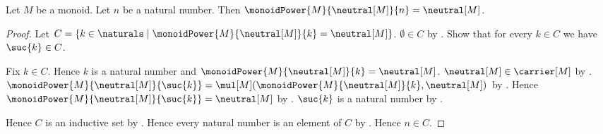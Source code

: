 \begin{proposition}\label{monoid_power_neutral}
    Let $M$ be a monoid.
    Let $n$ be a natural number.
    Then $\monoidPower{M}{\neutral[M]}{n}=\neutral[M]$.
\end{proposition}
\begin{proof}
    Let $C=\{k\in\naturals\mid
        \monoidPower{M}{\neutral[M]}{k}=\neutral[M]\}$.
    $\emptyset\in C$ by
        .
    Show that for every $k\in C$ we have $\suc{k}\in C$.
    \begin{subproof}
        Fix $k\in C$.
        Hence $k$ is a natural number and
            $\monoidPower{M}{\neutral[M]}{k}=\neutral[M]$.
        $\neutral[M]\in\carrier[M]$ by
            .
        $\monoidPower{M}{\neutral[M]}{\suc{k}}
            =\mul[M](\monoidPower{M}{\neutral[M]}{k},\neutral[M])$ by
            .
        Hence $\monoidPower{M}{\neutral[M]}{\suc{k}}
            =\neutral[M]$ by
            .
        $\suc{k}$ is a natural number by .
    \end{subproof}
    Hence $C$ is an inductive set by .
    Hence every natural number is an element of $C$ by
        .
    Hence $n\in C$.
\end{proof}

